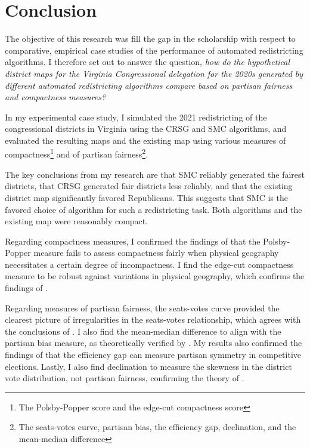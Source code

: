 \section{Conclusion}
\label{sec:conc}

The objective of this research was fill the gap in the scholarship with respect to comparative, empirical case studies of the performance of automated redistricting algorithms. I therefore set out to answer the question, \emph{how do the hypothetical district maps for the Virginia Congressional delegation for the 2020s generated by different automated redistricting algorithms compare based on partisan fairness and compactness measures?}

In my experimental case study, I simulated the 2021 redistricting of the congressional districts in Virginia using the CRSG and SMC algorithms, and evaluated the resulting maps and the existing map using various measures of compactness\footnote{The Polsby-Popper score and the edge-cut compactness score} and of partisan fairness\footnote{The seats-votes curve, partisan bias, the efficiency gap, declination, and the mean-median difference}. 

The key conclusions from my research are that SMC reliably generated the fairest districts, that CRSG generated fair districts less reliably, and that the existing district map significantly favored Republicans. This suggests that SMC is the favored choice of algorithm for such a redistricting task. Both algorithms and the existing map were reasonably compact.

Regarding compactness measures, I confirmed the findings of \textcite{mccartan2020} that the Polsby-Popper measure fails to assess compactness fairly when physical geography necessitates a certain degree of incompactness. I find the edge-cut compactness measure to be robust against variations in physical geography, which confirms the findings of \textcite{dube2016}.

Regarding measures of partisan fairness, the seats-votes curve provided the clearest picture of irregularities in the seats-votes relationship, which agrees with the conclusions of \textcite{katz2020}. I also find the mean-median difference to align with the partisan bias measure, as theoretically verified by \textcite{katz2020}. My results also confirmed the findings of \textcite{veomett2018} that the efficiency gap can measure partisan symmetry in competitive elections. Lastly, I also find declination to measure the skewness in the district vote distribution, not partisan fairness, confirming the theory of \textcite{katz2020}. 

